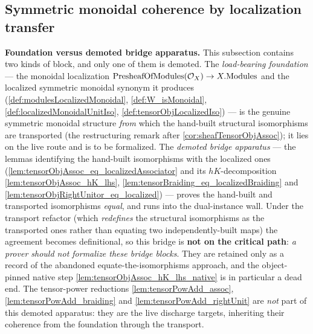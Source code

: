 \subsection{Symmetric monoidal coherence by localization transfer}
\label{sec:sgr_localized_monoidal}

\medskip
\noindent\textbf{Foundation versus demoted bridge apparatus.}
This subsection contains two kinds of block, and only one of them is demoted. The
\emph{load-bearing foundation} --- the monoidal localization
\(\mathrm{PresheafOfModules}(\mathcal{O}_X) \to X.\mathrm{Modules}\) and the localized symmetric monoidal
synonym it produces (\cref{def:modulesLocalizedMonoidal},
\cref{def:W_isMonoidal}, \cref{def:localizedMonoidalUnitIso},
\cref{def:tensorObjLocalizedIso}) --- is the genuine symmetric monoidal structure
\emph{from} which the hand-built structural isomorphisms are transported (the
restructuring remark after \cref{cor:sheafTensorObjAssoc}); it lies on the live
route and is to be formalized. The \emph{demoted bridge apparatus} --- the lemmas
identifying the hand-built isomorphisms with the localized ones
(\cref{lem:tensorObjAssoc_eq_localizedAssociator} and its \(hK\)-decomposition
\cref{lem:tensorObjAssoc_hK_lhs}, \cref{lem:tensorBraiding_eq_localizedBraiding}
and \cref{lem:tensorObjRightUnitor_eq_localized}) --- proves the hand-built and
transported isomorphisms \emph{equal}, and runs into the dual-instance wall. Under
the transport refactor (which \emph{redefines} the structural isomorphisms as the
transported ones rather than equating two independently-built maps) the agreement
becomes definitional, so this bridge is \textbf{not on the critical path}:
\emph{a prover should not formalize these bridge blocks}. They are retained only
as a record of the abandoned equate-the-isomorphisms approach, and the
object-pinned native step \cref{lem:tensorObjAssoc_hK_lhs_native} is in particular
a dead end. The tensor-power reductions \cref{lem:tensorPowAdd_assoc},
\cref{lem:tensorPowAdd_braiding} and \cref{lem:tensorPowAdd_rightUnit} are
\emph{not} part of this demoted apparatus: they are the live discharge targets,
inheriting their coherence from the foundation through the transport.
\medskip

